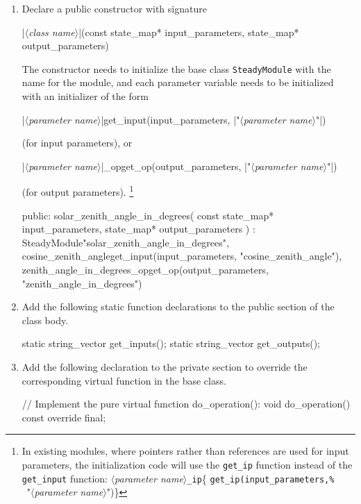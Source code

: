 \documentclass{article}\usepackage[]{graphicx}\usepackage[]{color}
\newcommand{\code}[1]{\lstinline[style=C++style]{#1}}
\newcommand{\placeholder}[1]{$\langle$\textrm{\textit{#1}}$\rangle$}
\newcommand{\stringplaceholder}[1]{{\color{stringcolor}"$\langle$\textrm{\textit{#1}}$\rangle$"}}
\begin{document}
\begin{enumerate}
\begin{example}[4]
       // Pointers to output parameters:
       double* zenith_angle_in_degrees_op;
  \end{example}

\item Declare a public constructor with signature
  \begin{C++listing}[4]
    |\placeholder{class name}|(const state_map* input_parameters, state_map* output_parameters)
  \end{C++listing}
  The constructor needs to initialize the base class
  \code{SteadyModule} with the name for the module, and each parameter
  variable needs to be initialized with an initializer of the form
  \begin{C++listing}[4]
    |\placeholder{parameter name}|{get_input(input_parameters, |\stringplaceholder{parameter name}|)}
  \end{C++listing}
  (for input parameters), or
  \begin{C++listing}[4]
    |\placeholder{parameter name}|_op{get_op(output_parameters, |\stringplaceholder{parameter name}|)}
  \end{C++listing}
  (for output parameters).%
  \footnote{In existing modules, where pointers rather than references
      are used for input parameters, the initialization code will use
      the \code{get_ip} function instead of the \code{get_input}
      function:
      \placeholder{parameter name}\code{_ip}\{%
      \lstinline!get_ip(input_parameters,%
      !\ \stringplaceholder{parameter name})\}
  }

  \begin{example}[4]
    public:
       solar_zenith_angle_in_degrees(
           const state_map* input_parameters,
           state_map* output_parameters
       )
           : SteadyModule{"solar_zenith_angle_in_degrees"},
           cosine_zenith_angle{get_input(input_parameters, "cosine_zenith_angle")},
           zenith_angle_in_degrees_op{get_op(output_parameters, "zenith_angle_in_degrees")}
           {}
  \end{example}

\item Add the following static function declarations to the public
  section of the class body.
  \begin{example}[4]
    static string_vector get_inputs();
    static string_vector get_outputs();
  \end{example}

\item Add the following declaration to the private section to override
  the corresponding virtual function in the base class.
  \begin{example}[4]
    // Implement the pure virtual function do_operation():
    void do_operation() const override final;
  \end{example}


\end{enumerate}
\end{document}
